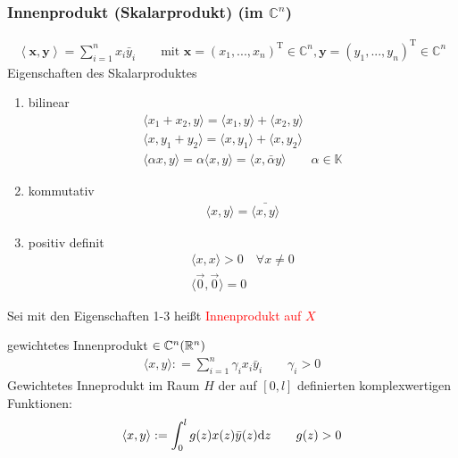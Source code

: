 \subsubsection{Innenprodukt (Skalarprodukt) (im $\mathbb{C}^n$)}
\begin{align*}
\left\langle \bm{x},\bm{y} \right\rangle = \sum_{i=1}^{n}x_i\bar{y}_i \qquad \textrm{mit }\bm{x}=(x_1,...,x_n)^\textrm{T} \in \mathbb{C}^n,\bm{y}=(y_1,...,y_n)^\textrm{T} \in \mathbb{C}^n
\end{align*}
Eigenschaften des Skalarproduktes
\begin{enumerate}
\item bilinear 
\begin{align*}
\langle x_1+x_2,y \rangle =\langle x_1,y \rangle +\langle x_2,y \rangle \\
\langle x,y_1+y_2 \rangle =\langle x,y_1 \rangle +\langle x,y_2 \rangle \\
\langle \alpha x,y \rangle =\alpha \langle x,y\rangle  = \langle x,\bar{\alpha}y\rangle \qquad \alpha \in \mathbb{K}
\end{align*}
\item kommutativ
\begin{align*}
\langle  x,y \rangle =\bar{\langle  x,y \rangle} 
\end{align*}
\item positiv definit
\begin{align*}
\langle  x,x \rangle > 0 \quad \forall x \neq 0 \\
\langle  \vec{0},\vec{0} \rangle = 0 
\end{align*}
\end{enumerate}
\begin{defi}[Skalarprodukt] Sei 
mit den Eigenschaften 1-3 heißt \textcolor{red}{Innenprodukt auf $X$}
\end{defi}
\begin{bsp} gewichtetes Innenprodukt $\in \mathbb{C}^n(\mathbb{R}^n)$
\begin{align*}
\langle x, y \rangle : = \sum_{i=1}^n \gamma_i x_i \bar{y}_i \qquad \gamma_i > 0
\end{align*} 
Gewichtetes Inneprodukt im Raum $H$ der auf $[0,l]$ definierten komplexwertigen Funktionen:
\begin{align*}
\langle x, y \rangle : = \int_{0}^l g(z)x(z)\bar{y}(z) \mathrm{d} z \qquad g(z) > 0
\end{align*} 
\end{bsp}
